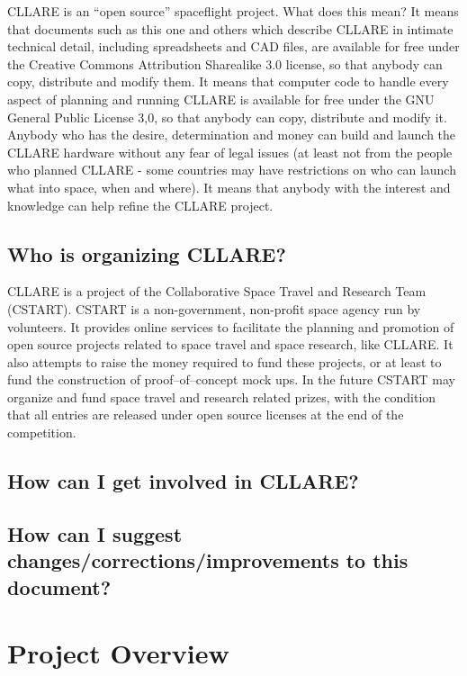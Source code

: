 \documentclass{report}
\begin{document}
CLLARE is an ``open source'' spaceflight project.  What does this mean?  It means that documents such as this one and others which describe CLLARE in intimate technical detail, including spreadsheets and CAD files, are available for free under the Creative Commons Attribution Sharealike 3.0 license, so that anybody can copy, distribute and modify them.  It means that computer code to handle every aspect of planning and running CLLARE is available for free under the GNU General Public License 3,0, so that anybody can copy, distribute and modify it.  Anybody who has the desire, determination and money can build and launch the CLLARE hardware without any fear of legal issues (at least not from the people who planned CLLARE - some countries may have restrictions on who can launch what into space, when and where).  It means that anybody with the interest and knowledge can help refine the CLLARE project.

\section{Who is organizing CLLARE?}

CLLARE is a project of the Collaborative Space Travel and Research Team (CSTART).  CSTART is a non-government, non-profit space agency run by volunteers.  It provides online services to facilitate the planning and promotion of open source projects related to space travel and space research, like CLLARE.  It also attempts to raise the money required to fund these projects, or at least to fund the construction of proof--of--concept mock ups.  In the future CSTART may organize and fund space travel and research related prizes, with the condition that all entries are released under open source licenses at the end of the competition.

\section{How can I get involved in CLLARE?}

\section{How can I suggest changes/corrections/improvements to this document?}


\chapter{Project Overview}
\end{document}
